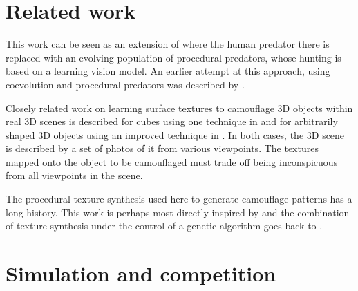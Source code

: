 \documentclass[sigconf]{acmart}
\begin{document}
\section{Related work}
This work can be seen as an extension of \citet{Reynolds2011} where the human predator there is replaced with an evolving population of procedural predators, whose hunting is based on a learning vision model. An earlier attempt at this approach, using coevolution and procedural predators was described by \citet{harrington_coevolution_2014}.
\par
Closely related work on learning surface textures to camouflage 3D objects within real 3D scenes is described for cubes using one technique in \citet{owens_camouflaging_2014} and for arbitrarily shaped 3D objects using an improved technique in \citet{guo_ganmouflage_2022}. In both cases, the 3D scene is described by a set of photos of it from various viewpoints. The textures mapped onto the object to be camouflaged must trade off being inconspicuous from all viewpoints in the scene.
\par
The procedural texture synthesis used here to generate camouflage patterns has a long history. This work is perhaps most directly inspired by \citet{perlin_image_1985} and the combination of texture synthesis under the control of a genetic algorithm goes back to \citet{sims_artificial_1991}. 
\par
[... TexSyn \textbf{[OK to mention name?]} is based on the “strongly typed” variant of Genetic Programming known as STGP \cite{montana_strongly_1995}, one of several grammar-based GP variants \cite{Mckay_2010}. ...
GP generally: 
\citet{cramer_representation_1985} and
\citet{koza_genetic_1992}
...]


\section{Simulation and competition}
\end{document}
